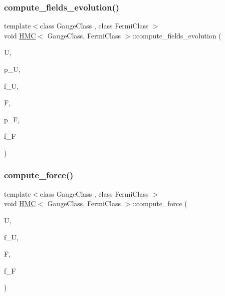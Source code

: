 \subsubsection{\texorpdfstring{compute\+\_\+fields\+\_\+evolution()}{compute\_fields\_evolution()}}
{\footnotesize\ttfamily template$<$class Gauge\+Class , class Fermi\+Class $>$ \\
void \hyperlink{class_h_m_c}{H\+MC}$<$ Gauge\+Class, Fermi\+Class $>$\+::compute\+\_\+fields\+\_\+evolution (\begin{DoxyParamCaption}\item[{Gauge\+Class \&}]{U,  }\item[{Gauge\+Class \&}]{p\+\_\+U,  }\item[{Gauge\+Class \&}]{f\+\_\+U,  }\item[{Fermi\+Class \&}]{F,  }\item[{Fermi\+Class \&}]{p\+\_\+F,  }\item[{Fermi\+Class \&}]{f\+\_\+F }\end{DoxyParamCaption})\hspace{0.3cm}{\ttfamily [inline]}}

\mbox{\label{class_h_m_c_a055e331f19f692a381f098e02f939e79}} 
\subsubsection{\texorpdfstring{compute\+\_\+force()}{compute\_force()}}
{\footnotesize\ttfamily template$<$class Gauge\+Class , class Fermi\+Class $>$ \\
void \hyperlink{class_h_m_c}{H\+MC}$<$ Gauge\+Class, Fermi\+Class $>$\+::compute\+\_\+force (\begin{DoxyParamCaption}\item[{Gauge\+Class \&}]{U,  }\item[{Gauge\+Class \&}]{f\+\_\+U,  }\item[{Fermi\+Class \&}]{F,  }\item[{Fermi\+Class \&}]{f\+\_\+F }\end{DoxyParamCaption})\hspace{0.3cm}{\ttfamily [inline]}}

\mbox{\label{class_h_m_c_aaf6eb48e4a79b5c65b7fd80e9f34f072}} 
